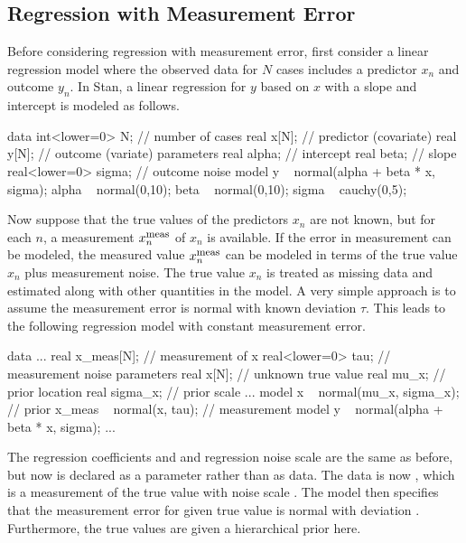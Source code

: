 \subsection{Regression with Measurement Error}

Before considering regression with measurement error, first consider a
linear regression model where the observed data for $N$ cases includes
a predictor $x_n$ and outcome $y_n$.  In Stan, a linear regression for
$y$ based on $x$ with a slope and intercept is modeled as follows.
%
\begin{stancode}
data {
  int<lower=0> N;        // number of cases
  real x[N];             // predictor (covariate)
  real y[N];             // outcome (variate)
}
parameters {
  real alpha;           // intercept
  real beta;            // slope 
  real<lower=0> sigma;  // outcome noise
}
model {
  y ~ normal(alpha + beta * x, sigma);
  alpha ~ normal(0,10);  
  beta ~ normal(0,10);
  sigma ~ cauchy(0,5);
}
\end{stancode}
%

Now suppose that the true values of the predictors $x_n$ are not
known, but for each $n$, a measurement $x^{\mbox{\footnotesize meas}}_n$ of $x_n$ is available.
If the error in measurement can be modeled, the measured value
$x^{\mbox{\footnotesize meas}}_n$ can be modeled in terms of the true value $x_n$ plus measurement
noise.  The true value $x_n$ is treated as missing data and estimated
along with other quantities in the model.  A very simple approach is
to assume the measurement error is normal with known deviation $\tau$.
This leads to the following regression model with constant measurement
error.
%
\begin{stancode}
data {
  ...
  real x_meas[N];     // measurement of x
  real<lower=0> tau;  // measurement noise
}
parameters {
  real x[N];          // unknown true value   
  real mu_x;          // prior location
  real sigma_x;       // prior scale
  ...
}
model {
  x ~ normal(mu_x, sigma_x);  // prior
  x_meas ~ normal(x, tau);    // measurement model
  y ~ normal(alpha + beta * x, sigma);
  ... 
}
\end{stancode}
%
The regression coefficients  and  and
regression noise scale  are the same as before, but now
 is declared as a parameter rather than as data.  The data is
now , which is a measurement of the true  value
with noise scale .  The model then specifies that the
measurement error for  given true value 
is normal with deviation .  Furthermore, the true values
 are given a hierarchical prior here.

